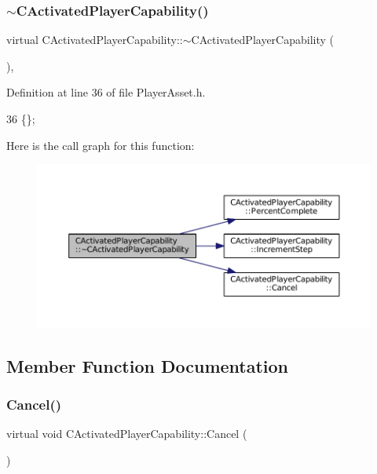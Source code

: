 \subsubsection{\texorpdfstring{$\sim$\+C\+Activated\+Player\+Capability()}{~CActivatedPlayerCapability()}}
{\footnotesize\ttfamily virtual C\+Activated\+Player\+Capability\+::$\sim$\+C\+Activated\+Player\+Capability (\begin{DoxyParamCaption}{ }\end{DoxyParamCaption})\hspace{0.3cm}{\ttfamily [inline]}, {\ttfamily [virtual]}}



Definition at line 36 of file Player\+Asset.\+h.


\begin{DoxyCode}
36 \{\};
\end{DoxyCode}
Here is the call graph for this function\+:\nopagebreak
\begin{figure}[H]
\begin{center}
\leavevmode
\includegraphics[width=350pt]{classCActivatedPlayerCapability_a75845fda9554fb75644aae5a6c5f0084_cgraph}
\end{center}
\end{figure}


\subsection{Member Function Documentation}
\hypertarget{classCActivatedPlayerCapability_a5cde83be468e262ad054d81e28684a81}{}\label{classCActivatedPlayerCapability_a5cde83be468e262ad054d81e28684a81} 
\subsubsection{\texorpdfstring{Cancel()}{Cancel()}}
{\footnotesize\ttfamily virtual void C\+Activated\+Player\+Capability\+::\+Cancel (\begin{DoxyParamCaption}{ }\end{DoxyParamCaption})\hspace{0.3cm}{\ttfamily [pure virtual]}}



